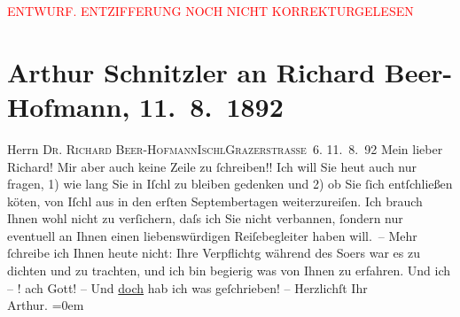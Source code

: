
\begin{center}
            \textcolor{red}{ENTWURF. ENTZIFFERUNG NOCH NICHT KORREKTURGELESEN}
                      \end{center}
            
               \section[Arthur Schnitzler an Richard Beer-Hofmann, 11. 8. 1892]{ Arthur Schnitzler an Richard Beer-Hofmann, 11. 8. 1892}\nopagebreak{}\rehead{ }\begin{ledgroupsized}[t]{13cm}\normalsize\beginnumbering{} \toendnotes[C]{\smallbreak\pagebreak[2]} 
\pstart{}{\pb}Herrn \textsc{Dr. Richard
                     Beer-Hofmann}\pend{}\pstart{}\textsc{Ischl}\pend{}\pstart{}\textsc{Grazerstraße 6}.\pend{}{\bigskip}\pstart
           \raggedleft{}{\pb}11. 8. 92\pend
           \pstart
           Mein lieber Richard! Mir aber auch keine Zeile zu ſchreiben!! Ich
               will Sie heut auch nur fragen, 1) wie lang Sie in Iſchl zu bleiben gedenken und 2) ob Sie ſich entſchließen kö{\geminationn}ten, von Iſchl aus in
               den erſten Septembertagen weiterzureiſen. Ich brauch Ihnen wohl nicht zu verſichern,
               daſs ich Sie nicht verbannen, ſondern nur eventuell \introOben{}an Ihnen\introOben{}
               einen liebenswürdigen Reiſebegleiter haben will. –\pend
           \pstart
           Mehr ſchreibe ich Ihnen heute nicht: Ihre Verpflichtg während des So{\geminationm}ers war es zu dichten und zu trachten, und ich bin
               begierig was von Ihnen zu erfahren. Und ich – ! ach Gott! – Und \uline{doch} hab ich was geſchrieben! –\pend
           \pstart
           Herzlichſt Ihr{\\[\baselineskip]}\spacefill\mbox{Arthur.}\pend
           \leftskip=0em{}\endnumbering{}\end{ledgroupsized}  \newcommand{\dateiname}{L00113}\newcommand{\titel}{Arthur Schnitzler an Richard Beer-Hofmann, 11. 8. 1892}\newcommand{\editorInnen}{Martin Anton Müller und Gerd-Hermann Susen}
      